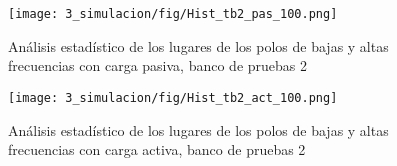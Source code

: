 \begin{figure}
    \centering
    \texttt{[image: 3\_simulacion/fig/Hist\_tb2\_pas\_100.png]}
    \caption{Análisis estadístico de los lugares de los polos de bajas y altas frecuencias con carga pasiva, banco de pruebas 2}
\end{figure}

\begin{figure}
    \centering
    \texttt{[image: 3\_simulacion/fig/Hist\_tb2\_act\_100.png]}
    \caption{Análisis estadístico de los lugares de los polos de bajas y altas frecuencias con carga activa, banco de pruebas 2}
\end{figure}
